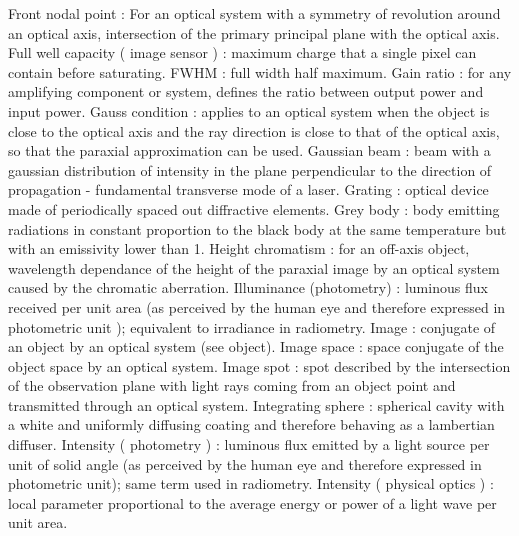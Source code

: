 Front nodal point                                    : For an optical system with a symmetry of revolution around an optical axis, intersection of the primary principal plane with the optical axis.
Full well capacity ( image sensor )                  : maximum charge that a single pixel can contain before saturating.
FWHM                                                 : full width half maximum.
Gain ratio                                           : for any amplifying component or system, defines the ratio between output power and input power.
Gauss condition                                      : applies to an optical system when the object is close to the optical axis and the ray direction is close to that of the optical axis, so that the paraxial approximation can be used.
Gaussian beam                                        : beam with a gaussian distribution of intensity in the plane perpendicular to the direction of propagation - fundamental transverse mode of a laser.
Grating                                              : optical device made of periodically spaced out diffractive elements.
Grey body                                            : body emitting radiations in constant proportion to the black body at the same temperature but with an emissivity lower than 1.
Height chromatism                                    : for an off-axis object, wavelength dependance of the height of the paraxial image by an optical system caused by the chromatic aberration.
Illuminance (photometry)                             : luminous flux received per unit area (as perceived by the human eye and therefore expressed in photometric unit ); equivalent to irradiance in radiometry.
Image                                                : conjugate of an object by an optical system (see object).
Image space                                          : space conjugate of the object space by an optical system.
Image spot                                           : spot described by the intersection of the observation plane with light rays coming from an object point and transmitted through an optical system.
Integrating sphere                                   : spherical cavity with a white and uniformly diffusing coating and therefore behaving as a lambertian diffuser.
Intensity ( photometry )                             : luminous flux emitted by a light source per unit of solid angle (as perceived by the human eye and therefore expressed in photometric unit); same term used in radiometry.
Intensity ( physical optics )                        : local parameter proportional to the average energy or power of a light wave per unit area.
